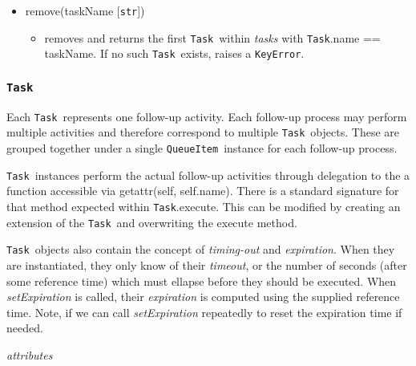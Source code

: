 \documentclass{article}
\newcommand{\QueueItem}{\texttt{QueueItem}}
\newcommand{\Task}{\texttt{Task}}
\newcommand{\pythonstr}{\texttt{str}}
\begin{document}
\begin{itemize}
{\begin{itemize}
            \item{adds a new \Task~to the \QueueItem~and updates attributes accordingly. \textit{newTasks} do not need to be ordered. Each item must be a subclas of \Task.}
        \end{itemize}
         }
    \item{remove(taskName [\pythonstr])
        \begin{itemize}
            \item{removes and returns the first \Task~within \textit{tasks} with \Task.name == taskName. If no such \Task~exists, raises a \texttt{KeyError}.}
        \end{itemize}
         }
\end{itemize}


\subsubsection{\Task}
\label{sec: Task}

Each \Task~represents one follow-up activity.
Each follow-up process may perform multiple activities and therefore correspond to multiple \Task~objects.
These are grouped together under a single \QueueItem~instance for each follow-up process.

\Task~instances perform the actual follow-up activities through delegation to the a function accessible via getattr(self, self.name).
There is a standard signature for that method expected within \Task.execute.
This can be modified by creating an extension of the \Task~and overwriting the execute method.

\Task~objects also contain the concept of \textit{timing-out} and \textit{expiration}.
When they are instantiated, they only know of their \textit{timeout}, or the number of seconds (after some reference time) which must ellapse before they should be executed.
When \textit{setExpiration} is called, their \textit{expiration} is computed using the supplied reference time.
Note, if we can call \textit{setExpiration} repeatedly to reset the expiration time if needed.

\vspace{0.5cm}
\noindent
\textit{attributes}
\end{document}
